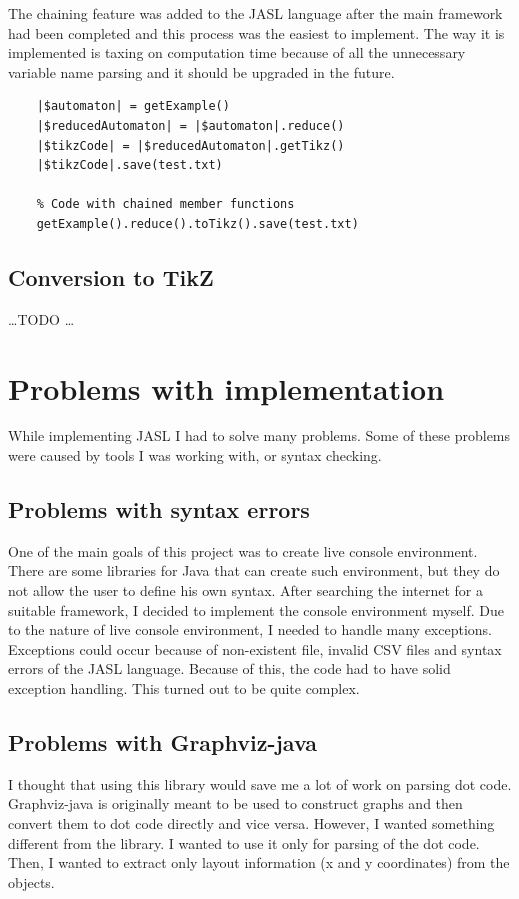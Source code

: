 \documentclass{ctuthesis}
\begin{document}
The chaining feature was added to the JASL language after the main framework had been completed and this process was the easiest to implement. The way it is implemented is taxing on computation time because of all the unnecessary variable name parsing and it should be upgraded in the future. 

\begin{minipage}{\linewidth}
\begin{lstlisting}[language = JASL]
	% Code without chained member function calls
	|$automaton| = getExample()
	|$reducedAutomaton| = |$automaton|.reduce()
	|$tikzCode| = |$reducedAutomaton|.getTikz()
	|$tikzCode|.save(test.txt)
	
	% Code with chained member functions
	getExample().reduce().toTikz().save(test.txt)
\end{lstlisting}
\end{minipage}

\subsection{Conversion to TikZ}
\ldots TODO \ldots

\section{Problems with implementation}
While implementing JASL I had to solve many problems. Some of these problems were caused by tools I was working with, or syntax checking. 

\subsection{Problems with syntax errors}
One of the main goals of this project was to create live console environment. There are some libraries for Java that can create such environment, but they do not allow the user to define his own syntax. After searching the internet for a suitable framework, I decided to implement the console environment myself. Due to the nature of live console environment, I needed to handle many exceptions. Exceptions could occur because of non-existent file, invalid CSV files and syntax errors of the JASL language. Because of this, the code had to have solid exception handling. This turned out to be quite complex.

\subsection{Problems with Graphviz-java}
\label{subsec:graphviz-java-problems}
I thought that using this library would save me a lot of work on parsing dot code. Graphviz-java is originally meant to be used to construct graphs and then convert them to dot code directly and vice versa. However, I wanted something different from the library. I wanted to use it only for parsing of the dot code. Then, I wanted to extract only layout information (x and y coordinates) from the objects. 
\end{document}
